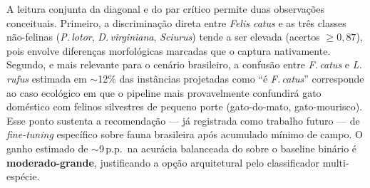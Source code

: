 A leitura conjunta da diagonal e do par crítico permite duas observações conceituais. Primeiro, a discriminação direta entre \emph{Felis catus} e as três classes não-felinas (\emph{P.\,lotor}, \emph{D.\,virginiana}, \emph{Sciurus}) tende a ser elevada (acertos $\geq 0{,}87$), pois envolve diferenças morfológicas marcadas que o \modeloSN{} captura nativamente. Segundo, e mais relevante para o cenário brasileiro, a confusão entre \emph{F.\,catus} e \emph{L.\,rufus} estimada em $\sim$12\% das instâncias projetadas como ``é \emph{F.\,catus}'' corresponde ao caso ecológico em que o pipeline mais provavelmente confundirá gato doméstico com felinos silvestres de pequeno porte (gato-do-mato, gato-mourisco). Esse ponto sustenta a recomendação --- já registrada como trabalho futuro --- de \emph{fine-tuning} específico sobre fauna brasileira após acumulado mínimo de campo. O ganho estimado de $\sim$9\,p.p.\ na acurácia balanceada do \modeloSN{} sobre o baseline binário é \textbf{moderado-grande}, justificando a opção arquitetural pelo classificador multi-espécie.

